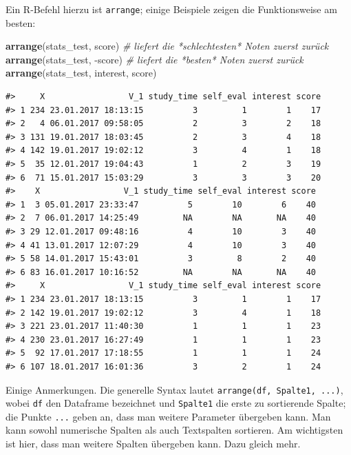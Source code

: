 \documentclass[12pt,ngerman,]{book}
\makeatletter
\newenvironment{Shaded}{\begin{snugshade}}{\end{snugshade}}
\newcommand{\KeywordTok}[1]{\textcolor[rgb]{0.13,0.29,0.53}{\textbf{{#1}}}}
\newcommand{\CommentTok}[1]{\textcolor[rgb]{0.56,0.35,0.01}{\textit{{#1}}}}
\newcommand{\NormalTok}[1]{{#1}}
\newenvironment{kframe}{%
\medskip{}
\setlength{\fboxsep}{.8em}
 \def\at@end@of@kframe{}%
 \ifinner\ifhmode%
  \def\at@end@of@kframe{\end{minipage}}%
  \begin{minipage}{\columnwidth}%
 \fi\fi%
 \def\FrameCommand##1{\hskip\@totalleftmargin \hskip-\fboxsep
 \colorbox{shadecolor}{##1}\hskip-\fboxsep
     \hskip-\linewidth \hskip-\@totalleftmargin \hskip\columnwidth}%
 \MakeFramed {\advance\hsize-\width
   \@totalleftmargin\z@ \linewidth\hsize
   \@setminipage}}%
 {\par\unskip\endMakeFramed%
 \at@end@of@kframe}
\renewenvironment{Shaded}{\begin{kframe}}{\end{kframe}}
\makeatother
\begin{document}
Ein R-Befehl hierzu ist \texttt{arrange}; einige
Beispiele zeigen die Funktionsweise am besten:

\begin{Shaded}
\begin{Highlighting}[]

\KeywordTok{arrange}\NormalTok{(stats_test, score) }\CommentTok{# liefert die *schlechtesten* Noten zuerst zurück}
\KeywordTok{arrange}\NormalTok{(stats_test, -score) }\CommentTok{# liefert die *besten* Noten zuerst zurück}
\KeywordTok{arrange}\NormalTok{(stats_test, interest, score)}
\end{Highlighting}
\end{Shaded}

\begin{verbatim}
#>     X                 V_1 study_time self_eval interest score
#> 1 234 23.01.2017 18:13:15          3         1        1    17
#> 2   4 06.01.2017 09:58:05          2         3        2    18
#> 3 131 19.01.2017 18:03:45          2         3        4    18
#> 4 142 19.01.2017 19:02:12          3         4        1    18
#> 5  35 12.01.2017 19:04:43          1         2        3    19
#> 6  71 15.01.2017 15:03:29          3         3        3    20
#>    X                 V_1 study_time self_eval interest score
#> 1  3 05.01.2017 23:33:47          5        10        6    40
#> 2  7 06.01.2017 14:25:49         NA        NA       NA    40
#> 3 29 12.01.2017 09:48:16          4        10        3    40
#> 4 41 13.01.2017 12:07:29          4        10        3    40
#> 5 58 14.01.2017 15:43:01          3         8        2    40
#> 6 83 16.01.2017 10:16:52         NA        NA       NA    40
#>     X                 V_1 study_time self_eval interest score
#> 1 234 23.01.2017 18:13:15          3         1        1    17
#> 2 142 19.01.2017 19:02:12          3         4        1    18
#> 3 221 23.01.2017 11:40:30          1         1        1    23
#> 4 230 23.01.2017 16:27:49          1         1        1    23
#> 5  92 17.01.2017 17:18:55          1         1        1    24
#> 6 107 18.01.2017 16:01:36          3         2        1    24
\end{verbatim}

Einige Anmerkungen. Die generelle Syntax lautet
\texttt{arrange(df,\ Spalte1,\ ...)}, wobei \texttt{df} den Dataframe
bezeichnet und \texttt{Spalte1} die erste zu sortierende Spalte; die
Punkte \texttt{...} geben an, dass man weitere Parameter übergeben kann.
Man kann sowohl numerische Spalten als auch Textspalten sortieren. Am
wichtigsten ist hier, dass man weitere Spalten übergeben kann. Dazu
gleich mehr.
\end{document}
